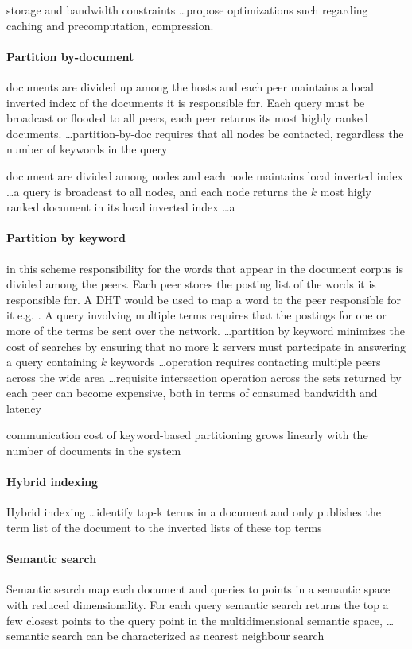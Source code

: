 \cite{LLH+03} storage and bandwidth constraints \ldots propose optimizations such regarding caching and precomputation, compression.

\paragraph{Partition by-document} documents are divided up among the hosts and each peer maintains a local inverted index of the documents it is responsible for. Each query must be broadcast or flooded to all peers, each peer returns its most highly ranked documents. \ldots partition-by-doc requires that all nodes be contacted, regardless the number of keywords in the query

document are divided among nodes and each node maintains local inverted index \ldots a query is broadcast to all nodes, and each node returns the $k$ most higly ranked document in its local inverted index \ldots a

\paragraph{Partition by keyword} in this scheme responsibility for the words that appear in the document corpus is divided among the peers. Each peer stores the posting list of the words it is responsible for. A DHT would be used to map a word to the peer responsible for it e.g. \cite{RV03}. A query involving multiple terms requires that the postings for one or more of the terms be sent over the network. \ldots partition by keyword minimizes the cost of searches by ensuring that no more k servers must partecipate in answering a query containing $k$ keywords \ldots operation requires contacting multiple peers across the wide area \ldots requisite intersection operation across the sets returned by each peer can become expensive, both in terms of consumed bandwidth and latency

communication cost of keyword-based partitioning grows linearly with the number of documents in the system

\paragraph{Hybrid indexing} Hybrid indexing \ldots identify top-k terms in a document and only publishes the term list of the document to the inverted lists of these top terms

\paragraph{Semantic search} Semantic search \cite{TXD03} map each document and queries to points in a semantic space with reduced dimensionality. For each query semantic search returns the top a few closest points to the query point in the multidimensional semantic space, \ldots semantic search can be characterized as nearest neighbour search

